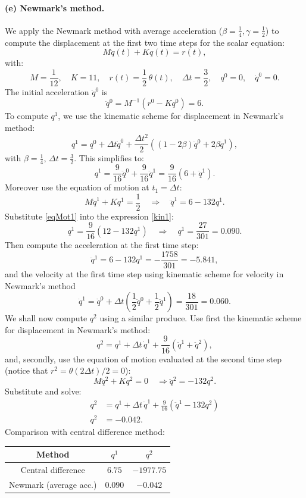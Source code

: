 \documentclass[12pt]{article}
\begin{document}
\paragraph*{(e) Newmark's method.}
We apply the Newmark method with average acceleration (\( \beta = \frac{1}{4}, \gamma = \frac{1}{2} \)) to compute the displacement at the first two time steps for the scalar equation:
\[
	M \ddot{q}(t) + K q(t) = r(t),
\]
with:
\[
	M = \frac{1}{12}, \quad K = 11, \quad r(t) = \frac{1}{2} \, \theta(t), \quad \Delta t = \frac{3}{2}, \quad q^0 = 0, \quad \dot{q}^0 = 0.
\]
The initial acceleration \( \ddot{q}^0 \) is
\[
	\ddot{q}^0 = M^{-1} (r^0 - K q^0) = 6.
\]
To compute \( q^1 \), we use the kinematic scheme for displacement in Newmark's method:
\[
	q^1 = q^0 + \Delta t \dot{q}^0 + \frac{\Delta t^2}{2} \left( (1 - 2\beta) \ddot{q}^0 + 2\beta \ddot{q}^1 \right),
\]
with \( \beta = \tfrac{1}{4} \), \( \Delta t = \tfrac{3}{2} \). This simplifies to:
\begin{equation}
	q^1 = \frac{9}{16} \ddot{q}^0 + \frac{9}{16} \ddot{q}^1 = \frac{9}{16}(6 + \ddot{q}^1).
	\label{kin1}
\end{equation}
Moreover use the equation of motion at \( t_1 =\Delta t\):
\begin{equation}
	M \ddot{q}^1 + K q^1 = \frac{1}{2} \quad \Rightarrow \quad \ddot{q}^1 = 6 - 132q^1.
	\label{eqMot1}
\end{equation}
Substitute \eqref{eqMot1} into the expression \eqref{kin1}:
\[
	q^1 = \frac{9}{16} \left( 12 - 132q^1\right) \quad \Rightarrow \quad q^1 = \frac{27}{301}=0.090.
\]
Then compute the acceleration at the first time step:
\[
	\ddot{q}^1 = 6 - 132q^1 = -\frac{1758}{301} =-5.841,
\]
and the velocity at the first time step using kinematic scheme for velocity in Newmark's method
\[
	\dot{q}^1 = \dot{q}^0 + \Delta t \left( \frac{1}{2} \ddot{q}^0 + \frac{1}{2} \ddot{q}^1 \right)
	= \frac{18}{301}=0.060.
\]
We shall now compute \( q^2 \) using a similar produce. Use first the kinematic scheme for displacement in Newmark's method:
\[
	q^2 = q^1 + \Delta t \, \dot{q}^1 + \frac{9}{16} (\ddot{q}^1 + \ddot{q}^2),
\]
and, secondly, use the equation of motion evaluated at the second time step (notice that $r^2=\theta(2\Delta t)/2=0$):
\[
	M \ddot{q}^2 + K q^2 = 0 \quad \Rightarrow
	\ddot{q}^2 = -132q^2.
\]
Substitute and solve:
\begin{align*}
	q^2   & = q^1 + \Delta t \, \dot{q}^1 + \frac{9}{16} (\ddot{q}^1 - 132q^2) \\
	{q}^2 & = -0.042.
\end{align*}
Comparison with central difference method:
\begin{table}[h!]
	\centering
	\renewcommand{\arraystretch}{1.4}
	\begin{tabular}{|c|c|c|}
		\hline
		\textbf{Method}        & \boldmath$q^1$ & \boldmath$q^2$ \\
		\hline
		Central difference     & $6.75$         & $-1977.75$     \\
		Newmark (average acc.) & $0.090$        & $-0.042$       \\
		\hline
	\end{tabular}
\end{table}
\end{document}
